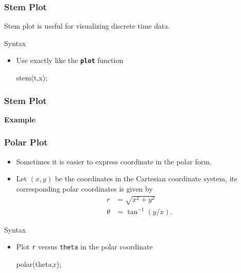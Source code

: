 \documentclass[compress]{beamer}  %
\newcommand{\tttbf}[1]{\texttt{\textbf{#1}}} %
\begin{document}
\begin{frame}[fragile]
\frametitle{Stem Plot}
Stem plot is useful for visualizing discrete time data.

\begin{block}{Syntax}
\begin{itemize}
    \item Use exactly like the \tttbf{plot} function
          \begin{matlabcodebeamer}[numbers=none,frame=none]
          stem(t,x);
          \end{matlabcodebeamer}
\end{itemize}
\end{block}

\end{frame}
\begin{frame}[fragile]
\frametitle{Stem Plot}
\textbf{Example} 

\setcounter{subfigure}{0}
\begin{figure}
    \centering
\end{figure}

\end{frame}
\begin{frame}[fragile]
\frametitle{Polar Plot}
\begin{itemize}[<+->]
    \item Sometimes it is easier to express coordinate in the polar form.
    \item Let $(x,y)$ be the coordinates in the Cartesian coordinate system, its corresponding polar coordinates is given by
\begin{align}
    r      &= \sqrt{x^2 + y^2} \\
    \theta &= \tan^{-1}(y/x).
\end{align}
\end{itemize}

\pause
\begin{block}{Syntax}
\begin{itemize}
    \item Plot \texttt{r} versus \texttt{theta} in the polar coordinate
          \begin{matlabcodebeamer}[numbers=none,frame=none]
          polar(theta,r);
          \end{matlabcodebeamer}
\end{itemize}
\end{block}

\end{frame}
\end{document}
